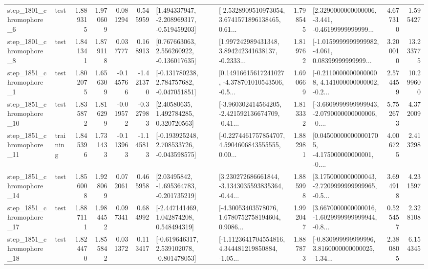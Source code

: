 \begin{tabular}{llrrrrllrlrr}
  step\_1801\_chromophore\_6 &      test &      1.889315 &    1.970609 &      0.081294 &  0.545959 &   [1.494337947, -2.208969317, -0.519459203] &  [-2.5328909510973054, 3.6741571896138465, 0.61... &       1.798545 &  [2.3290000000000006, -3.441, -0.46199999999999... &            4.677310 &          1.595427 \\
  step\_1801\_chromophore\_8 &      test &      1.841341 &    1.879118 &      0.037777 &  0.168913 &    [0.767663063, 2.556260922, -0.136017635] &  [1.997242989431348, 3.894242341638137, -0.2333... &       1.819762 &  [-1.0159999999999982, -4.061, 0.08399999999999... &            3.200010 &         13.233775 \\
  step\_1851\_chromophore\_1 &      test &      1.802075 &    1.656309 &     -0.145766 & -1.421370 &   [-0.131780238, 2.784757682, -0.047051851] &  [0.14916615617241027, -4.378701010543506, -0.5... &       1.690669 &  [-0.21100000000000008, 4.141000000000002, -0.2... &            2.574459 &         10.299600 \\
 step\_1851\_chromophore\_10 &      test &      1.835872 &    1.816299 &     -0.019572 & -0.327983 &      [2.40580635, 1.492784285, 0.320720563] &  [-3.960302414564205, -2.421592136674709, -0.41... &       1.813332 &  [-3.6609999999999943, -2.0790000000000006, -0.... &            5.752673 &          4.372009 \\
 step\_1851\_chromophore\_11 &  training &      1.845396 &    1.731433 &     -0.113963 & -1.145813 &   [-0.193925248, 2.708533726, -0.043598575] &  [-0.2274461757854707, 4.5904606843555555, 0.00... &       1.882981 &  [0.045000000000001705, -4.175000000000001, -0.... &            4.006725 &          2.413298 \\
 step\_1851\_chromophore\_14 &      test &      1.856008 &    1.928069 &      0.072061 &  0.465958 &    [2.03495842, -1.695364783, -0.201735219] &  [3.230272686661844, -3.1343035593835364, -0.44... &       1.885998 &  [3.1750000000000043, -2.7209999999999965, -0.5... &            3.694918 &          4.231597 \\
 step\_1851\_chromophore\_17 &      test &      1.887111 &    1.984452 &      0.097341 &  0.684992 &    [-2.447141469, 1.042874208, 0.548494319] &  [-4.30053403578076, 1.6780752758194604, 0.9086... &       1.992047 &  [3.6670000000000016, -1.6029999999999944, -0.8... &            0.525457 &          2.328108 \\
 step\_1851\_chromophore\_18 &      test &      1.824470 &    1.855842 &      0.031372 &  0.113417 &   [-0.619646317, 2.539102078, -0.801478053] &  [-1.1123641704554816, 4.344481219850884, -1.05... &       1.887873 &  [-0.830999999999996, 3.8160000000000025, -1.34... &            2.380805 &          6.154345 \\

\end{tabular}

